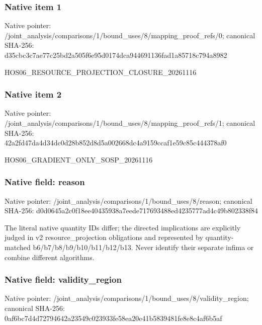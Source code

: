 \documentclass[10pt,a4paper]{article}
\begin{document}
\subsubsection{Native item 1}
Native pointer: /joint\_\allowbreak{}analysis/comparisons/1/bound\_\allowbreak{}uses/8/mapping\_\allowbreak{}proof\_\allowbreak{}refs/0; canonical SHA-256: d35cbc3c7ae77c25bd2a505f6e95d0174dca944691136fad1a85718c794a8982

\begingroup\raggedright\sloppy HOS06\_\allowbreak{}RESOURCE\_\allowbreak{}PROJECTION\_\allowbreak{}CLOSURE\_\allowbreak{}20261116\par\endgroup

\subsubsection{Native item 2}
Native pointer: /joint\_\allowbreak{}analysis/comparisons/1/bound\_\allowbreak{}uses/8/mapping\_\allowbreak{}proof\_\allowbreak{}refs/1; canonical SHA-256: 42a2fd47da4d34dc0d28b852d8d5a002668dc4a9159ccaf1e59c85c444378af0

\begingroup\raggedright\sloppy HOS06\_\allowbreak{}GRADIENT\_\allowbreak{}ONLY\_\allowbreak{}SOSP\_\allowbreak{}20261116\par\endgroup

\subsubsection{Native field: reason}
Native pointer: /joint\_\allowbreak{}analysis/comparisons/1/bound\_\allowbreak{}uses/8/reason; canonical SHA-256: d0d0645a2c0f18ee40435938a7eede717693488ed4235777ad4c49b802338f84

\begingroup\raggedright\sloppy The literal native quantity IDs differ;\allowbreak{} the directed implications are explicitly judged in v2 resource\_\allowbreak{}projection obligations and represented by quantity-matched b6/\allowbreak{}b7/\allowbreak{}b8/\allowbreak{}b9/\allowbreak{}b10/\allowbreak{}b11/\allowbreak{}b12/\allowbreak{}b13. Never identify their separate infima or combine different algorithms.\par\endgroup

\subsubsection{Native field: validity\_\allowbreak{}region}
Native pointer: /joint\_\allowbreak{}analysis/comparisons/1/bound\_\allowbreak{}uses/8/validity\_\allowbreak{}region; canonical SHA-256: 0af6bc7d4d72794642a23549c023933fe58ea20e41b5839481fe8e8c4af6b5af
\end{document}
